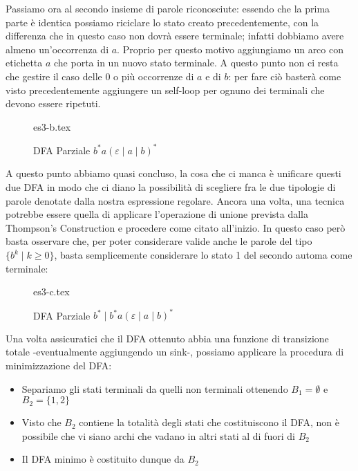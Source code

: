 \documentclass[class=book, crop=false, oneside, 12pt]{standalone}
\begin{document}
Passiamo ora al secondo insieme di parole riconosciute: essendo che la prima parte è identica possiamo riciclare lo stato creato precedentemente, con la differenza che in questo caso non dovrà essere terminale; infatti dobbiamo avere almeno un'occorrenza di \(a\). Proprio per questo motivo aggiungiamo un arco con etichetta \(a\) che porta in un nuovo stato terminale. A questo punto non ci resta che gestire il caso delle 0 o più occorrenze di \(a\) e di \(b\): per fare ciò basterà come visto precedentemente aggiungere un self-loop per ognuno dei terminali che devono essere ripetuti.


\begin{figure}[H]
	\centering
    {es3-b.tex}
    \caption{DFA Parziale \(b^* a (\varepsilon \mid a \mid b)^*\)}
    \label{fig:dfa-pt2-ex3}
\end{figure}

A questo punto abbiamo quasi concluso, la cosa che ci manca è unificare questi due DFA in modo che ci diano la possibilità di scegliere fra le due tipologie di parole denotate dalla nostra espressione regolare. Ancora una volta, una tecnica potrebbe essere quella di applicare l'operazione di unione prevista dalla Thompson's Construction e procedere come citato all'inizio. In questo caso però basta osservare che, per poter considerare valide anche le parole del tipo \(\{b^k \mid k \geq 0\}\), basta semplicemente considerare lo stato 1 del secondo automa come terminale: 

\begin{figure}[H]
	\centering
    {es3-c.tex}
    \caption{DFA Parziale \(b^* \mid b^* a (\varepsilon \mid a \mid b)^*\)}
    \label{fig:dfa-pt3-ex3}
\end{figure}

Una volta assicuratici che il DFA ottenuto abbia una funzione di transizione totale -eventualmente aggiungendo un sink-,
possiamo applicare la procedura di minimizzazione del DFA:

\begin{itemize}
    \item Separiamo gli stati terminali da quelli non terminali ottenendo \(B_1 = \emptyset\) e  \(B_2 = \{1, 2\}\)
    \item Visto che \(B_2\) contiene la totalità degli stati che costituiscono il DFA, non è possibile che vi siano archi che vadano in altri stati al di fuori di \(B_2\)
    \item Il DFA minimo è costituito dunque da \(B_2\)
\end{itemize}
\end{document}
